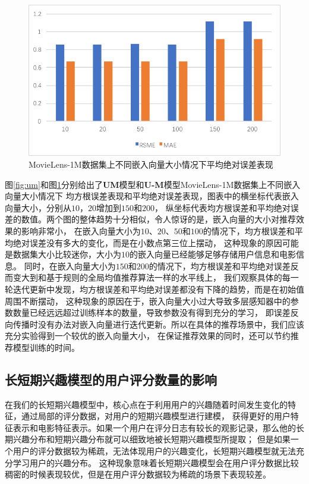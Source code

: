 \begin{figure}[htbp]
    \centering
    \includegraphics[scale=0.7]{images/U_M.pdf}
    \caption{MovieLens-1M数据集上不同嵌入向量大小情况下平均绝对误差表现}
    \label{fig:u_m}
\end{figure}

图\ref{fig:um}和图\ref{fig:u_m}分别给出了\textbf{UM}模型和\textbf{U-M}模型MovieLens-1M数据集上不同嵌入向量大小情况下
均方根误差表现和平均绝对误差表现，图表中的横坐标代表嵌入向量大小，分别从$10$，$20$增加到$150$和$200$，
纵坐标代表均方根误差和平均绝对误差的数值。两个图的整体趋势十分相似，令人惊讶的是，嵌入向量的大小对推荐效果的影响非常小，
在嵌入向量大小为$10$、$20$、$50$和$100$的情况下，均方根误差和平均绝对误差没有多大的变化，而是在小数点第三位上摆动，
这种现象的原因可能是数据集大小比较迷你，大小为$10$的嵌入向量已经能够足够存储用户信息和电影信息。
同时，在嵌入向量大小为$150$和$200$的情况下，均方根误差和平均绝对误差反而变大到和基于规则的全局均值推荐算法一样的水平线上，
我们观察具体的每一轮迭代更新中发现，均方根误差和平均绝对误差都没有下降的趋势，而是在初始值周围不断摆动，
这种现象的原因在于，嵌入向量大小过大导致多层感知器中的参数数量已经远远超过训练样本的数量，导致参数没有得到充分的学习，
即误差反向传播时没有办法对嵌入向量进行迭代更新。所以在具体的推荐场景中，我们应该充分实验得到一个较优的嵌入向量大小，
在保证推荐效果的同时，还可以节约推荐模型训练的时间。

\subsection{长短期兴趣模型的用户评分数量的影响}
在我们的长短期兴趣模型中，核心点在于利用用户的兴趣随着时间发生变化的特征，通过局部的评分数据，对用户的短期兴趣模型进行建模，
获得更好的用户特征表示和电影特征表示。如果一个用户在评分日志有较长的观影记录，那么他的长期兴趣分布和短期兴趣分布就可以细致地被长短期兴趣模型所提取；
但是如果一个用户的评分数据较为稀疏，无法体现用户的兴趣变化，长短期兴趣模型就无法充分学习用户的兴趣分布。
这种现象意味着长短期兴趣模型会在用户评分数据比较稠密的时候表现较优，但是在用户评分数据较为稀疏的场景下表现较差。

